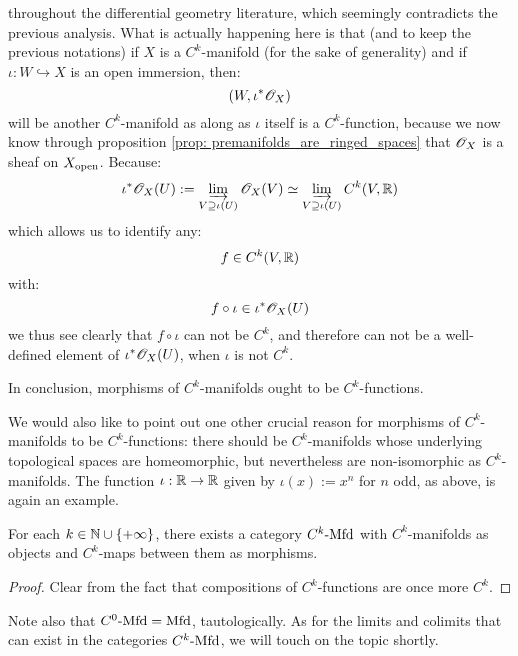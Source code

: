 \begin{remark}
            \begin{center}
            \end{center}
            \noindent
            throughout the differential geometry literature, which seemingly contradicts the previous analysis. What is actually happening here is that (and to keep the previous notations) if $X$ is a $C^k$-manifold (for the sake of generality) and if $\iota: W \hookrightarrow X$ is an open immersion, then:
                $$(W, \iota^*\mathscr{O}_X)$$
            will be another $C^k$-manifold as along as $\iota$ itself is a $C^k$-function, because we now know through proposition \ref{prop: premanifolds_are_ringed_spaces} that $\mathscr{O}_X$ is a sheaf on $X_{\mathrm{open}}$. Because:
                $$\iota^*\mathscr{O}_X(U) := \varinjlim_{ V \supseteq \iota(U) } \mathscr{O}_X(V) \simeq  \varinjlim_{ V \supseteq \iota(U) } C^k(V, \mathbb{R})$$
            which allows us to identify any:
                $$f \in C^k(V, \mathbb{R})$$
            with:
                $$f \circ \iota \in \iota^*\mathscr{O}_X(U)$$
            we thus see clearly that $f \circ \iota$ can not be $C^k$, and therefore can not be a well-defined element of $\iota^*\mathscr{O}_X(U)$, when $\iota$ is not $C^k$.

            In conclusion, morphisms of $C^k$-manifolds ought to be $C^k$-functions.

            We would also like to point out one other crucial reason for morphisms of $C^k$-manifolds to be $C^k$-functions: there should be $C^k$-manifolds whose underlying topological spaces are homeomorphic, but nevertheless are non-isomorphic as $C^k$-manifolds. The function $\iota: \mathbb{R} \to \mathbb{R}$ given by $\iota(x) := x^n$ for $n$ odd, as above, is again an example. 
        \end{remark}
        \begin{proposition} \label{prop: categories_of_differentiable_manifolds}
            For each $k \in \mathbb{N} \cup \{+\infty\}$, there exists a category $C^k\text{-}\mathrm{Mfd}$ with $C^k$-manifolds as objects and $C^k$-maps between them as morphisms.
        \end{proposition}
            \begin{proof}
                Clear from the fact that compositions of $C^k$-functions are once more $C^k$.
            \end{proof}
        Note also that $C^0\text{-}\mathrm{Mfd} = \mathrm{Mfd}$, tautologically. As for the limits and colimits that can exist in the categories $C^k\text{-}\mathrm{Mfd}$, we will touch on the topic shortly.
        
